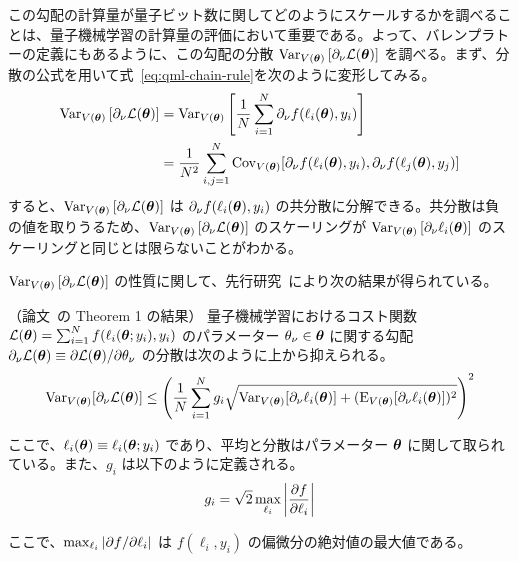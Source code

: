 この勾配の計算量が量子ビット数に関してどのようにスケールするかを調べることは、量子機械学習の計算量の評価において重要である。よって、バレンプラトーの定義にもあるように、この勾配の分散 $\operatorname{Var}_{V(\boldsymbol{\theta})}\qty[\partial_\nu \mathcal{L}(\boldsymbol{\theta})]$ を調べる。まず、分散の公式を用いて式~\eqref{eq:qml-chain-rule}を次のように変形してみる。
\begin{align}
    \operatorname{Var}_{V(\boldsymbol{\theta})}\qty[\partial_\nu \mathcal{L}(\boldsymbol{\theta})]
    &= \operatorname{Var}_{V(\boldsymbol{\theta})}\qty[\frac1N\sum_{i=1}^N \partial_\nu f(\ell_i(\boldsymbol{\theta}),y_i)]\nonumber\\
    &= \frac{1}{N^2} \sum_{i,j=1}^N \operatorname{Cov}_{V(\boldsymbol{\theta})}[\partial_\nu f(\ell_i(\boldsymbol{\theta}),y_i), \partial_\nu f(\ell_j(\boldsymbol{\theta}),y_j)]
\end{align}
すると、$\operatorname{Var}_{V(\boldsymbol{\theta})}\qty[\partial_\nu \mathcal{L}(\boldsymbol{\theta})]$ は $\partial_\nu f(\ell_i(\boldsymbol{\theta}),y_i)$ の共分散に分解できる。共分散は負の値を取りうるため、$\operatorname{Var}_{V(\boldsymbol{\theta})}\qty[\partial_\nu \mathcal{L}(\boldsymbol{\theta})]$ のスケーリングが $\operatorname{Var}_{V(\boldsymbol{\theta})}\qty[\partial_\nu \ell_i(\boldsymbol{\theta})]$ のスケーリングと同じとは限らないことがわかる。

$\operatorname{Var}_{V(\boldsymbol{\theta})}\qty[\partial_\nu \mathcal{L}(\boldsymbol{\theta})]$ の性質に関して、先行研究~\cite{thanasilp2021subtleties}により次の結果が得られている。

\begin{screen}
    \begin{theorem}\label{thm:qml-upper-var-sutlties}
        （論文~\cite{thanasilp2021subtleties}の Theorem 1 の結果）
        量子機械学習におけるコスト関数 $\mathcal{L}(\boldsymbol{\theta}) = \sum_{i=1}^N f(\ell_i(\boldsymbol{\theta};y_i),y_i)$ のパラメーター $\theta_\nu \in \boldsymbol{\theta}$ に関する勾配 $\partial_\nu \mathcal{L}(\boldsymbol{\theta}) \equiv \partial \mathcal{L}(\boldsymbol{\theta})/\partial \theta_\nu$ の分散は次のように上から抑えられる。
        \begin{align}\label{eq:qml-upper-var-sutlties}
            \operatorname{Var}_{V(\boldsymbol{\theta})}[\partial_\nu\mathcal{L}(\boldsymbol{\theta})] \leq \qty(\frac1N \sum_{i=1}^N g_i \sqrt{\operatorname{Var}_{V(\boldsymbol{\theta})}[\partial_\nu \ell_i(\boldsymbol{\theta})] + (\operatorname{E}_{V(\boldsymbol{\theta})}[\partial_\nu \ell_i(\boldsymbol{\theta})])^2 })^2
        \end{align}
        
        ここで、$\ell_i(\boldsymbol{\theta}) \equiv \ell_i(\boldsymbol{\theta};y_i)$ であり、平均と分散はパラメーター $\boldsymbol{\theta}$ に関して取られている。また、$g_i$ は以下のように定義される。
        \begin{align}
            g_i = \sqrt{2} \max_{\ell_i} \abs{\pdv{f}{\ell_i}}
        \end{align}
        
        ここで、$\max_{\ell_i} \abs{\partial f/\partial \ell_i}$ は $f(\ell_i, y_i)$ の偏微分の絶対値の最大値である。
    \end{theorem}
\end{screen}

